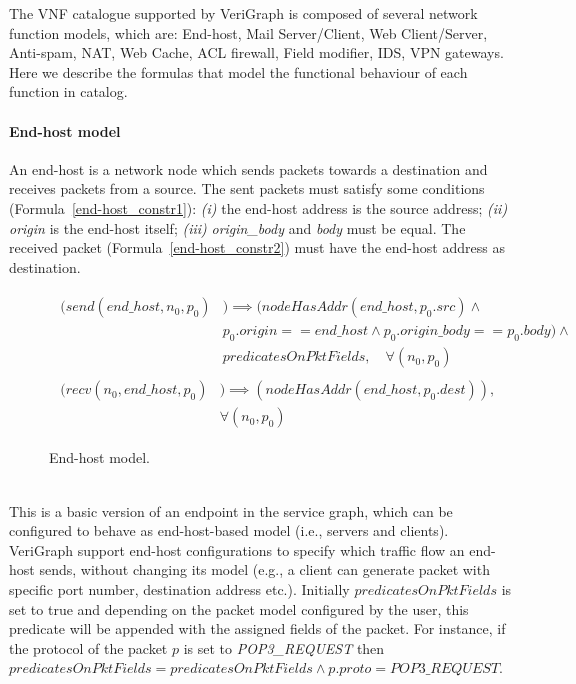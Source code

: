 
The VNF catalogue supported by VeriGraph is composed of several network function models, which are: End-host, Mail Server/Client, Web Client/Server, Anti-spam, NAT, Web Cache, ACL firewall, Field modifier, IDS, VPN gateways. Here we describe the formulas that model the functional behaviour of each function in catalog.


\paragraph{End-host model}
An end-host is a network node which sends packets towards a destination and receives packets from a source. The sent packets must satisfy some conditions (Formula~\ref{end-host_constr1}): \textit{(i)} the end-host address is the source address; \textit{(ii)} \textit{origin} is the end-host itself; \textit{(iii)} \textit{origin\_body} and \textit{body}  must be equal. The received packet (Formula~\ref{end-host_constr2}) must have the end-host address as destination. 
\begin{figure}[h]
	{\footnotesize
		\begin{subequations}
			\begin{align}
				\begin{split}
					\label{end-host_constr1}
					(send(end\_host, n_{0}, p_{0}) &) \implies (nodeHasAddr(end\_host, p_{0}.src) \wedge \\
					& p_{0}.origin == end\_host \wedge p_{0}.origin\_body == p_{0}.body)  \wedge \\
					& predicatesOnPktFields, \quad   \forall (n_{0}, p_{0})
				\end{split} \\
				\begin{split}
					\label{end-host_constr2}
					(recv(n_{0}, end\_host, p_{0}) &) \implies (nodeHasAddr(end\_host, p_{0}.dest)),\\
					& \forall (n_{0}, p_{0})
				\end{split}
			\end{align}
		\end{subequations}
	}%
	\caption{End-host model.}
	\label{end-host_model}
\end{figure}
\\
This is a basic version of an endpoint in the service graph, which can be configured to behave as end-host-based model (i.e., servers and clients). VeriGraph support end-host configurations to specify which traffic flow an end-host sends, without changing its model (e.g., a client can generate packet with specific port number, destination address etc.). Initially $predicatesOnPktFields$ is set to true and depending on the packet model configured by the user, this predicate will be appended with the assigned fields of the packet. For instance, if the protocol of the packet $p$ is set to \textit{POP3\_REQUEST} then $predicatesOnPktFields=predicatesOnPktFields \wedge p.proto=POP3\_REQUEST $.

